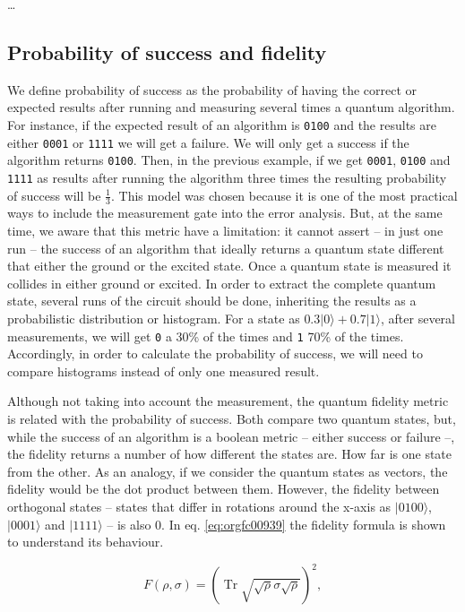 \ldots{}

\subsection*{Probability of success and fidelity}
\label{sec:orgd0011fb}

We define probability of success as the probability of having the correct or expected results after running and measuring several times a quantum algorithm.
For instance, if the expected result of an algorithm is \texttt{0100} and the results are either \texttt{0001} or \texttt{1111} we will get a failure.
We will only get a success if the algorithm returns \texttt{0100}.
Then, in the previous example, if we get \texttt{0001}, \texttt{0100} and \texttt{1111} as results after running the algorithm three times the resulting probability of success will be \(\frac{1}{3}\).
This model was chosen because it is one of the most practical ways to include the measurement gate into the error analysis.
But, at the same time, we aware that this metric have a limitation: it cannot assert -- in just one run -- the success of an algorithm that ideally returns a quantum state different that either the ground or the excited state.
Once a quantum state is measured it collides in either ground or excited.
In order to extract the complete quantum state, several runs of the circuit should be done, inheriting the results as a probabilistic distribution or histogram.
For a state as \(0.3 | 0 \rangle + 0.7 | 1 \rangle\), after several measurements, we will get \texttt{0} a 30\% of the times and \texttt{1} 70\% of the times.
Accordingly, in order to calculate the probability of success, we will need to compare histograms instead of only one measured result.

Although not taking into account the measurement, the quantum fidelity metric is related with the probability of success.
Both compare two quantum states, but, while the success of an algorithm is a boolean metric -- either success or failure --, the fidelity returns a number of how different the states are.
How far is one state from the other.
As an analogy, if we consider the quantum states as vectors, the fidelity would be the dot product between them.
However, the fidelity between orthogonal states -- states that differ in rotations around the x-axis as \(| 0100 \rangle\), \(| 0001 \rangle\) and \(| 1111 \rangle\) -- is also 0.
In eq. \ref{eq:orgfc00939} the fidelity formula is shown to understand its behaviour.

\begin{equation}
\label{eq:orgfc00939}
{\displaystyle F(\rho ,\sigma )=\left(\operatorname {Tr} {\sqrt {{\sqrt {\rho }}\sigma {\sqrt {\rho }}}}\right)^{2},}
\end{equation}

